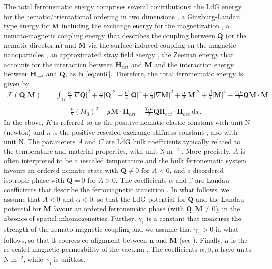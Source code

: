 \documentclass{article}
\def\Qvec{\mathbf{Q}}
\def \Mvec{\mathbf{M}}
\def\nvec{\mathbf{n}}
\def\Hvec{\mathbf{H}}
\def\d{\mathrm{d}}
\begin{document}
The total ferronematic energy comprises several contributions: the LdG energy for the nematic/orientational ordering in two dimensions \cite{Gennes, han2020reduced}, a Ginzburg-Landau type energy for $\Mvec$ including the exchange energy for the magnetization \cite{brown1966magnetoelastic, hubert2008magnetic}, a nemato-magnetic coupling energy that describes the coupling between $\Qvec$ (or the nematic director $\nvec$) and $\Mvec$ via the surface-induced coupling on the magnetic nanoparticles \cite{Bisht2020}, an approximated stray field energy \cite{Giogia}, the Zeeman energy that accounts for the interaction between $\Hvec_{ext}$ and $\Mvec$ \cite{brown1966magnetoelastic} and the interaction energy between $\Hvec_{ext}$ and $\Qvec$, as in \eqref{eq:en6'}. 
Therefore, the total ferronematic energy is given by
\begin{equation} \label{mathcalF}
\begin{aligned}
\mathscr{F}\left(\Qvec, \Mvec\right) =& \int_\Omega\frac{K}{2} | \nabla \Qvec|^2 + \frac{A}{2}|\Qvec|^2 + \frac{C}{4}|\Qvec|^4 + \frac{\kappa}{2} |\nabla \Mvec|^2
+ \frac{\alpha}{2}|\Mvec|^2 + \frac{\beta}{4}|\Mvec|^4 - \frac{\gamma_1\mu}{2}\Qvec\Mvec\cdot\Mvec %
\\\\& 
\;\;\;+ %
\frac{\mu}{2}\left(M_3\right)^2 - \mu\Mvec\cdot \Hvec_{ext}- \frac{\chi_1\mu}{2}\Qvec\Hvec_{ext}\cdot\Hvec_{ext}\;\d x.
\end{aligned}
\end{equation}
\noindent In the above, $K$ is referred to as the positive nematic elastic constant \cite{Gennes} with unit N (newton) and $\kappa$ is the positive rescaled exchange stiffness constant \cite{hubert2008magnetic}, also with unit N. 
The parameters $A$ and $C$ are LdG bulk coefficients typically related to the temperature and material properties, with unit N$\cdot$m$^{-2}$ \cite{newtonmottram}. More precisely, $A$ is often interpreted to be a rescaled temperature and the bulk ferronematic system favours an ordered nematic state with $\Qvec \neq 0$ for $A<0$, and a disordered isotropic phase with $\Qvec = 0$ for $A>0$. The coefficients $\alpha$ and $\beta$ are Landau coefficients that describe the ferromagnetic transition \cite{Mertelj}. In what follows, we assume that $A<0$ and $\alpha<0$, so that the LdG potential for $\Qvec$ and the Landau potential for $\Mvec$ favour an ordered ferronematic phase (with $\Qvec, \Mvec \neq 0$), in the absence of spatial inhomogeneities. Further, $\gamma_1$ is a constant that measures the strength of the nemato-magnetic coupling \cite{Mertelj} and we assume that $\gamma_1 >0$ in what follows, so that it coerces co-alignment between $\nvec$ and $\Mvec$ (see \cite{Bisht2020}). Finally, $\mu$ is the re-scaled magnetic permeability of the vacuum \cite{hubert2008magnetic}. The coefficients $\alpha, \beta, \mu$ have units N$\cdot$m$^{-2}$, 
while $\gamma_1$ is unitless.
\end{document}

